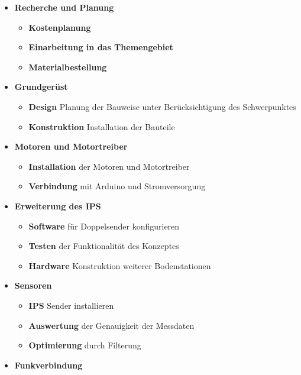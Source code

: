 \documentclass[lang=ngerman,inputenc=utf8,fontsize=10pt]{ldvarticle}
\begin{document}
\begin{itemize}
	\item \textbf{Recherche und Planung}
		\begin{itemize}
			\item \textbf{Kostenplanung}
			\item \textbf{Einarbeitung in das Themengebiet}
			\item \textbf{Materialbestellung}
		\end{itemize}
		
	\item \textbf{Grundgerüst}
		\begin{itemize}
			\item \textbf{Design} Planung der Bauweise unter Berücksichtigung des Schwerpunktes
			\item \textbf{Konstruktion} Installation der Bauteile
		\end{itemize}
		
	\item \textbf{Motoren und Motortreiber} 
		\begin{itemize}
			\item \textbf{Installation} der Motoren und Motortreiber
			\item \textbf{Verbindung} mit Arduino und Stromversorgung
		\end{itemize}
		
	\item \textbf{Erweiterung des IPS}  
		\begin{itemize}
			\item \textbf{Software} für Doppelsender konfigurieren
			\item \textbf{Testen} der Funktionalität des Konzeptes
			\item \textbf{Hardware} Konstruktion weiterer Bodenstationen
		\end{itemize}
		
	\item \textbf{Sensoren}
		\begin{itemize}
			\item \textbf{IPS} Sender installieren
			\item \textbf{Auswertung} der Genauigkeit der Messdaten
			\item \textbf{Optimierung} durch Filterung
		\end{itemize}
		
	\item \textbf{Funkverbindung}
		\begin{itemize}
		

\end{itemize}
\end{itemize}
\end{document}
